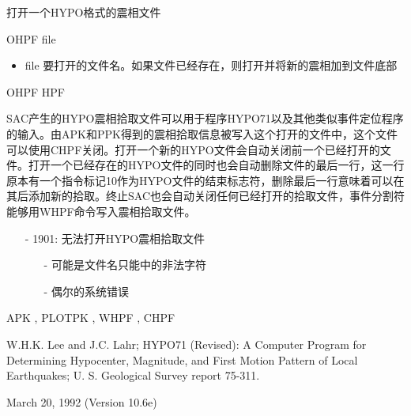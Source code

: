 \label{cmd:ohpf}

打开一个HYPO格式的震相文件

OHPF {file}

\begin{itemize}
\item file  要打开的文件名。如果文件已经存在，则打开并将新的震相加到文件底部
\end{itemize}

OHPF HPF

SAC产生的HYPO震相拾取文件可以用于程序HYPO71以及其他类似事件定位程序的输入。由APK和PPK得到的震相拾取信息被写入这个打开的文件中，这个文件可以使用CHPF关闭。打开一个新的HYPO文件会自动关闭前一个已经打开的文件。打开一个已经存在的HYPO文件的同时也会自动删除文件的最后一行，这一行原本有一个指令标记10作为HYPO文件的结束标志符，删除最后一行意味着可以在其后添加新的拾取。终止SAC也会自动关闭任何已经打开的拾取文件，事件分割符能够用WHPF命令写入震相拾取文件。

\begin{itemize}
\item[-]1901: 无法打开HYPO震相拾取文件
	\begin{itemize}
	\item[-]可能是文件名只能中的非法字符
	\item[-]偶尔的系统错误
	\end{itemize}
\end{itemize}

APK , PLOTPK , WHPF , CHPF

W.H.K. Lee and J.C. Lahr; HYPO71 (Revised): A Computer Program for Determining Hypocenter, Magnitude, and First Motion Pattern of Local Earthquakes; U. S. Geological Survey report 75-311.

March 20, 1992 (Version 10.6e)
